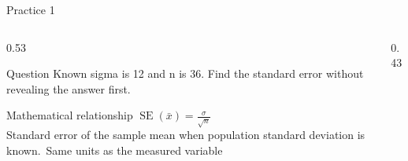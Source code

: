 \documentclass[aspectratio=169]{beamer}
\begin{document}
\begin{frame}{Practice 1}
\begin{columns}[T]
\begin{column}{0.53\textwidth}
\begin{block}{Question}
\small Known sigma is 12 and n is 36. Find the standard error without revealing the answer first.
\end{block}

\begin{block}{Mathematical relationship}
\centering\Large $\operatorname{SE}(\bar{x})=\frac{\sigma}{\sqrt{n}}$\\[0.12cm]
\small Standard error of the sample mean when population standard deviation is known.\ Same units as the measured variable
\end{block}
\end{column}
\begin{column}{0.43\textwidth}
\begin{center}\end{center}
\end{column}
\end{columns}

\end{frame}
\end{document}
